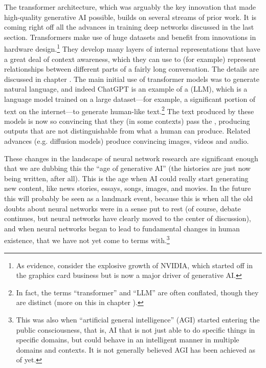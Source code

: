 The transformer architecture, which was arguably the key innovation that made high-quality generative AI possible, builds on several streams of prior work. It is coming right off all the advances in training deep networks discussed in the last section. Transformers make use of huge datasets and benefit from innovations in hardware design.\footnote{As evidence, consider the explosive growth of NVIDIA, which started off in the graphics card business but is now a major driver of generative AI.} They develop many layers of internal representations that have a great deal of context awareness, which they can use to (for example) represent relationships between different parts of a fairly long conversation. The details are discussed in chapter . The main initial use of transformer models was to generate natural language, and indeed ChatGPT is an example of a  (LLM), which is a language model trained on a large dataset---for example, a significant portion of text on the internet---to generate human-like text.\footnote{In fact, the terms ``transformer'' and ``LLM'' are often conflated, though they are distinct (more on this in chapter ).}  The text produced by these models is now so convincing that they (in some contexts) pass the , producing outputs that are not distinguishable from what a human can produce. Related advances (e.g. diffusion models) produce convincing images, videos and audio. 

These changes in the landscape of neural network research are significant enough that we are dubbing this the ``age of generative AI'' (the histories are just now being written, after all). This is the age when AI could really start generating new content, like news stories, essays, songs, images, and movies. In the future this will probably be seen as a landmark event, because this is when all the old doubts about neural networks were in a sense put to rest (of course, debate continues, but neural networks have clearly moved to the center of discussion), and when neural networks began to lead to fundamental changes in human existence, that we have not yet come to terms with.\footnote{This was also when ``artificial general intelligence'' (AGI) started entering the public consciousness, that is, AI that is not just able to do specific things in specific domains, but could behave in an intelligent manner in multiple domains and contexts. It is not generally believed AGI has been achieved as of yet.}

